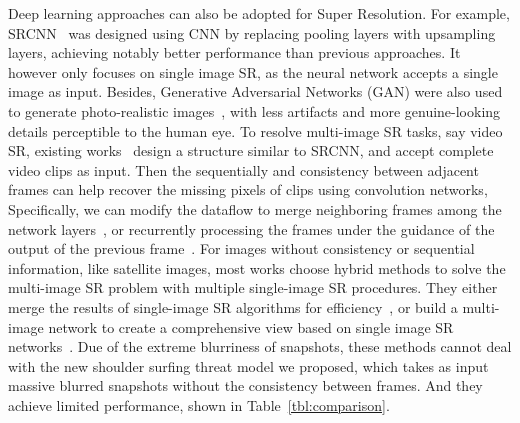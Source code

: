Deep learning approaches can also be adopted for Super Resolution. For example, SRCNN~\cite{dong2015image} was designed using CNN by replacing pooling layers with upsampling layers, achieving notably better performance than previous approaches. It however only focuses on single image SR, as the neural network accepts a single image as input. Besides, Generative Adversarial Networks (GAN) were also used to generate photo-realistic images~\cite{ledig2017photo}, with less artifacts and more genuine-looking details perceptible to the human eye. To resolve multi-image SR tasks, say video SR, existing works~\cite{shi2016real, kappeler2016video} design a structure similar to SRCNN, and accept complete video clips as input. Then the sequentially and consistency between adjacent frames can help recover the missing pixels of clips using convolution networks, Specifically,
we can modify the dataflow to merge neighboring frames among the network layers~\cite{huang2017video}, or recurrently processing the frames under the guidance of the output of the previous frame~\cite{sajjadi2018frame}. For images without consistency or sequential information, like satellite images, most works choose hybrid methods to solve the multi-image SR problem with multiple single-image SR procedures. They either merge the results of single-image SR algorithms for efficiency~\cite{kawulok2019deep}, or build a multi-image network to create a comprehensive view based on single image SR networks~\cite{8834937}. Due of the extreme blurriness of snapshots, these methods cannot deal with the new shoulder surfing threat model we proposed, which takes as input massive blurred snapshots without the consistency between frames. And they achieve limited performance, shown in Table~\ref{tbl:comparison}.

